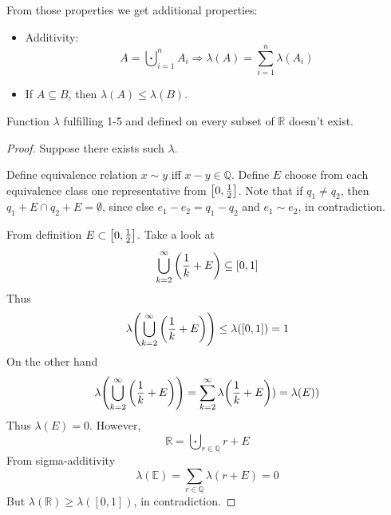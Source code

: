 From those properties we get additional properties:
\begin{itemize}
	\item Additivity:
	$$A = \bigcupdot_{i=1}^n A_i  \Rightarrow \lambda(A) = \sum_{i=1}^n \lambda(A_i)$$
	\item  If $A \subseteq B$, then $\lambda(A) \leq \lambda(B)$.
\end{itemize}
\begin{theorem}Function $\lambda$ fulfilling 1-5 and defined on every subset of $\mathbb{R}$ doesn't exist.
	\begin{proof}
		
		Suppose there exists such $\lambda$.
		
		Define equivalence relation $x\sim y$ iff $x-y \in \mathbb{Q}$. Define $E$ choose from each equivalence class one representative from $\qty[0, \frac{1}{2}]$. Note that if $q_1\neq q_2$, then $q_1+E \cap q_2 + E = \emptyset$, since else $e_1-e_2=q_1-q_2$ and $e_1\sim e_2$, in contradiction.
		
		From definition $E \subset \qty[0, \frac{1}{2}]$. Take a look at
		$$\bigcup_{k=2}^\infty \qty(\frac{1}{k}+E) \subseteq \qty[0,1]$$
		Thus
		$$\lambda \qty(\bigcup_{k=2}^\infty \qty(\frac{1}{k}+E) ) \leq \lambda\qty([0,1])=1$$
		On the other hand
		$$\lambda \qty(\bigcup_{k=2}^\infty \qty(\frac{1}{k}+E) ) = \sum_{k=2}^\infty \lambda\qty(\frac{1}{k}+E) ) = \lambda\qty(E) )$$
		Thus $\lambda(E)=0$. However, 
		$$\mathbb{R} = \bigcupdot_{r\in \mathbb{Q}} r+E$$
		From sigma-additivity
		$$\lambda(\mathbb{E}) = \sum_{r\in \mathbb{Q}} \lambda(r+E) = 0$$
		But $\lambda(\mathbb{R}) \geq \lambda([0,1])$, in contradiction.
	\end{proof}
\end{theorem}